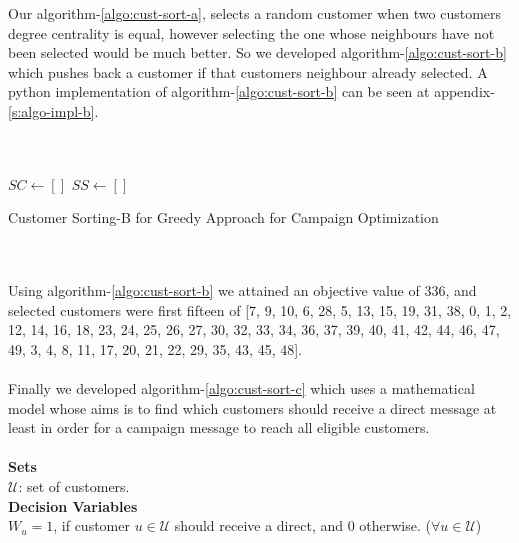 \documentclass[11pt]{article}
\begin{document}
Our algorithm-\ref{algo:cust-sort-a}, selects a random customer when two customers degree centrality is equal, however selecting the one whose neighbours have not been selected would be much better. So we developed algorithm-\ref{algo:cust-sort-b} which pushes back a customer if that customers neighbour already selected. A python implementation of algorithm-\ref{algo:cust-sort-b} can be seen at appendix-\ref{s:algo-impl-b}.\\
\\
\\
\begin{algorithm}[H]
\State $SC \gets []$\;
\State $SS \gets []$\;

\caption{Customer Sorting-B for Greedy Approach for Campaign Optimization}
\label{algo:cust-sort-b}
\end{algorithm}
\\
\hbox{}
\\
Using algorithm-\ref{algo:cust-sort-b} we attained an objective value of 336, and selected customers were first fifteen of [7, 9, 10, 6, 28, 5, 13, 15, 19, 31, 38, 0, 1, 2, 12, 14, 16, 18, 23, 24, 25, 26, 27, 30, 32, 33, 34, 36, 37, 39, 40, 41, 42, 44, 46, 47, 49, 3, 4, 8, 11, 17, 20, 21, 22, 29, 35, 43, 45, 48].
\\
\hbox{}
\\
Finally we developed algorithm-\ref{algo:cust-sort-c} which uses a mathematical model whose aims is to find which customers should receive a direct message at least in order for a campaign message to reach all eligible customers.
\\
\hbox{}
\\
\noindent \textbf{Sets}\\

\noindent ${\mathcal{U}}$: set of customers. \\

\noindent \textbf{Decision Variables}\\

\noindent $W_{u}=1$, if customer $u \in \mathcal{U}$ should receive a direct, and 0 otherwise.
($\forall u \in \mathcal{U}$)\\
\end{document}
